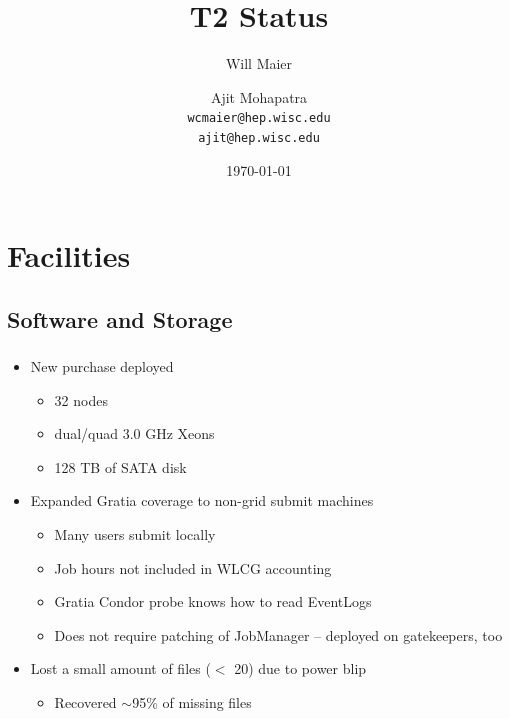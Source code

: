\documentclass{beamer}
\title{T2 Status}
\author[Maier, Mohapatra]{
    Will Maier \and Ajit Mohapatra\\ 
    {\tt wcmaier@hep.wisc.edu}\\
    {\tt ajit@hep.wisc.edu}}
\institute[Wisconsin]{University of Wisconsin - High Energy Physics}
\date{\today}
\newcommand{\ca}{\ensuremath{\sim}}
\begin{document}
\begin{frame}
    \titlepage
\end{frame}



\section{Facilities}
\subsection{Software and Storage}
\begin{frame}
\frametitle{}
\begin{itemize}
    \item New purchase deployed
    \begin{itemize}
        \item 32 nodes 
        \item dual/quad 3.0 GHz Xeons
        \item 128 TB of SATA disk
    \end{itemize}
    \item Expanded Gratia coverage to non-grid submit machines
    \begin{itemize}
        \item Many users submit locally
        \item Job hours not included in WLCG accounting
        \item Gratia Condor probe knows how to read EventLogs
        \item Does not require patching of JobManager -- deployed on gatekeepers, too
    \end{itemize}
    \item Lost a small amount of files ($<$ 20) due to power blip
    \begin{itemize}
        \item Recovered \ca{}95\% of missing files
    \end{itemize}
\end{itemize}
\end{frame}
\end{document}
